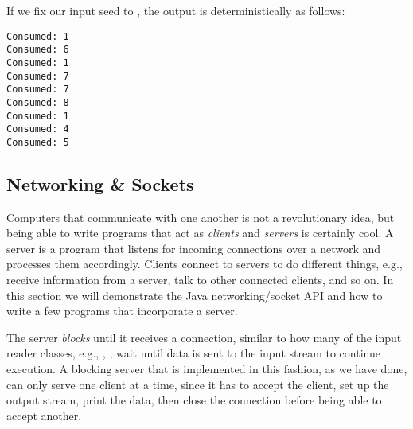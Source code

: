 If we fix our input seed to , the output is deterministically as follows:

\par{\footnotesize
\begin{verbatim}
Consumed: 1
Consumed: 6
Consumed: 1
Consumed: 7
Consumed: 7
Consumed: 8
Consumed: 1
Consumed: 4
Consumed: 5
\end{verbatim}
}

\subsection*{Networking \& Sockets}

Computers that communicate with one another is not a revolutionary idea, but being able to write programs that act as \textit{clients} and \textit{servers} is certainly cool. A server is a program that listens for incoming connections over a network and processes them accordingly. Clients connect to servers to do different things, e.g., receive information from a server, talk to other connected clients, and so on. In this section we will demonstrate the Java networking/socket API and how to write a few programs that incorporate a server.


The server \textit{blocks} until it receives a connection, similar to how many of the input reader classes, e.g., , , wait until data is sent to the input stream to continue execution. A blocking server that is implemented in this fashion, as we have done, can only serve one client at a time, since it has to accept the client, set up the output stream, print the data, then close the connection before being able to accept another.

